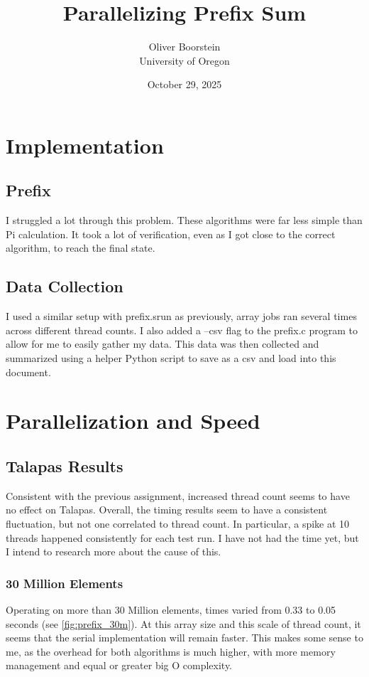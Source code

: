 \documentclass[11pt]{article}
\title{Parallelizing Prefix Sum}
\author{Oliver Boorstein \\ University of Oregon}
\date{October 29, 2025}
\begin{document}
\twocolumn[
  \maketitle
  \vspace{-1em}
]
\section{Implementation}
\subsection{Prefix}
I struggled a lot through this problem. These algorithms were far less simple than Pi calculation. It took a lot of verification, even as I got close to the correct algorithm, to reach the final state. 
\subsection{Data Collection}
I used a similar setup with prefix.srun as previously, array jobs ran several times across different thread counts. I also added a --csv flag to the prefix.c program to allow for me to easily gather my data. This data was then collected and summarized using a helper Python script to save as a csv and load into this document.
\section{Parallelization and Speed}
\subsection{Talapas Results}
Consistent with the previous assignment, increased thread count seems to have no effect on Talapas. Overall, the timing results seem to have a consistent fluctuation, but not one correlated to thread count. In particular, a spike at 10 threads happened consistently for each test run. I have not had the time yet, but I intend to research more about the cause of this.
\subsubsection{30 Million Elements}
Operating on more than 30 Million elements, times varied from 0.33 to 0.05 seconds (see \ref{fig:prefix_30m}). At this array size and this scale of thread count, it seems that the serial implementation will remain faster. This makes some sense to me, as the overhead for both algorithms is much higher, with more memory management and equal or greater big O complexity.
\end{document}
